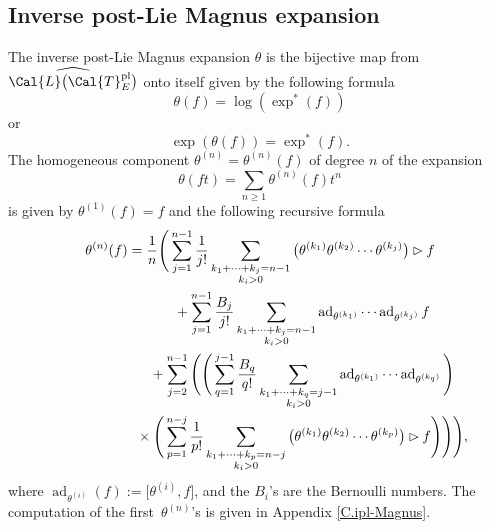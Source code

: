 \documentclass[10pt,a4paper]{amsart}
\numberwithin{equation}{section}
\begin{document}
\subsection{Inverse post-Lie Magnus expansion}

The inverse post-Lie Magnus expansion $\theta$ is the bijective map from $\widehat{\Cal{L}\big(\Cal{T}^{\rm pl}_E\big)}$ onto itself given by the following formula
\begin{equation}\label{IPLME}
\theta(f) = \log(\exp^*(f))
\end{equation}
or
\begin{equation*}%
\exp(\theta(f)) = \exp^*(f).
\end{equation*}
The homogeneous component $\theta^{(n)}=\theta^{(n)}(f)$ of degree $n$ of the expansion
\begin{displaymath}
\theta(ft)=\sum_{n\geq 1}{\theta^{(n)}(f)t^n}
\end{displaymath}
is given by $\theta^{(1)}(f)=f$ and the following recursive formula \cite{ELM2015}
\begin{gather}
\theta^{(n)}(f)
= \frac{1}{n} \Bigg( \sum_{j=1}^{n-1}{\frac{1}{j!}\sum_{\substack{k_1 + \cdots + k_j = n-1 \\ k_i>0}}
{\big(\theta^{(k_1)}\theta^{(k_2)} \cdots \theta^{(k_j)}\big) \rhd f}}\nonumber
\\ \hphantom{\theta^{(n)}(f)=\frac{1}{n} \Bigg(}
+ \sum_{j=1}^{n-1}{\frac{B_j}{j!}\sum_{\substack{k_1 + \cdots + k_j = n-1 \\ k_i>0}}
{\operatorname{ad}_{\theta^{(k_1)}} \cdots \operatorname{ad}_{\theta^{(k_j)}} f}}\nonumber
\\ \hphantom{\theta^{(n)}(f)=\frac{1}{n} \Bigg(}
{}+ \sum_{j=2}^{n-1} \Bigg(\Bigg( \sum_{q=1}^{j-1}{\frac{B_q}{q!}
\sum_{\substack{k_1 + \cdots + k_q = j-1 \\ k_i>0}}\operatorname{ad}_{\theta^{(k_1)}} \cdots \operatorname{ad}_{\theta^{(k_q)}} \Bigg)}\nonumber
\\ \hphantom{\theta^{(n)}(f)=\frac{1}{n} \Bigg(}
{}\times\Bigg(\sum_{p=1}^{n-j}{\frac{1}{p!}\sum_{\substack{k_1 + \cdots + k_p = n-j \\
k_i>0}}{\big(\theta^{(k_1)}\theta^{(k_2)} \cdots \theta^{(k_p)}\big) \rhd f}} \Bigg)\Bigg)\Bigg),
\label{IPL}
\end{gather}
where $\operatorname{ad}_{\theta^{(i)}}(f):= \big[\theta^{(i)}, f\big]$, and the $B_i$'s are the Bernoulli numbers. The computation of the first~$\theta^{(n)}$'s is given in Appendix \ref{C.ipl-Magnus}.
\end{document}
